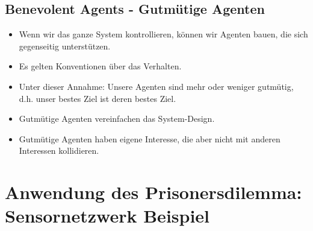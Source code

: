 \documentclass{article} %
\begin{document}
	\subsection{Benevolent Agents - Gutmütige Agenten}
	\begin{itemize}
		\item Wenn wir das ganze System kontrollieren, können wir Agenten bauen, die sich gegenseitig unterstützen.
		\item Es gelten Konventionen über das Verhalten.
		\item Unter dieser Annahme: Unsere Agenten sind mehr oder weniger gutmütig, d.h. unser bestes Ziel ist deren bestes Ziel.
		\item Gutmütige Agenten vereinfachen das System-Design.
		\item Gutmütige Agenten haben eigene Interesse, die aber nicht mit anderen Interessen kollidieren.
	\end{itemize}

\section{Anwendung des Prisonersdilemma: Sensornetzwerk Beispiel}
\end{document}
